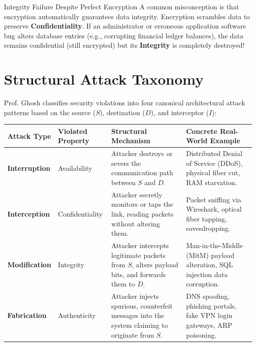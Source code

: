 \documentclass[11pt,a4paper,openany]{report}
\begin{document}
\begin{warnbox}{Integrity Failure Despite Perfect Encryption}
A common misconception is that encryption automatically guarantees data integrity. Encryption scrambles data to preserve \textbf{Confidentiality}. If an administrator or erroneous application software bug alters database entries (e.g., corrupting financial ledger balances), the data remains confidential (still encrypted) but its \textbf{Integrity} is completely destroyed!
\end{warnbox}

\section{Structural Attack Taxonomy}
Prof. Ghosh classifies security violations into four canonical architectural attack patterns based on the source ($S$), destination ($D$), and interceptor ($I$):

\begin{center}
\begin{tabularx}{\textwidth}{>{\bfseries}l l p{3.2cm} X}
\toprule
Attack Type & Violated Property & Structural Mechanism & Concrete Real-World Example\\
\midrule
Interruption & Availability & Attacker destroys or severs the communication path between $S$ and $D$. & Distributed Denial of Service (DDoS), physical fiber cut, RAM starvation.\\
Interception & Confidentiality & Attacker secretly monitors or taps the link, reading packets without altering them. & Packet sniffing via Wireshark, optical fiber tapping, eavesdropping.\\
Modification & Integrity & Attacker intercepts legitimate packets from $S$, alters payload bits, and forwards them to $D$. & Man-in-the-Middle (MitM) payload alteration, SQL injection data corruption.\\
Fabrication & Authenticity & Attacker injects spurious, counterfeit messages into the system claiming to originate from $S$. & DNS spoofing, phishing portals, fake VPN login gateways, ARP poisoning.\\
\bottomrule
\end{tabularx}
\end{center}
\end{document}
